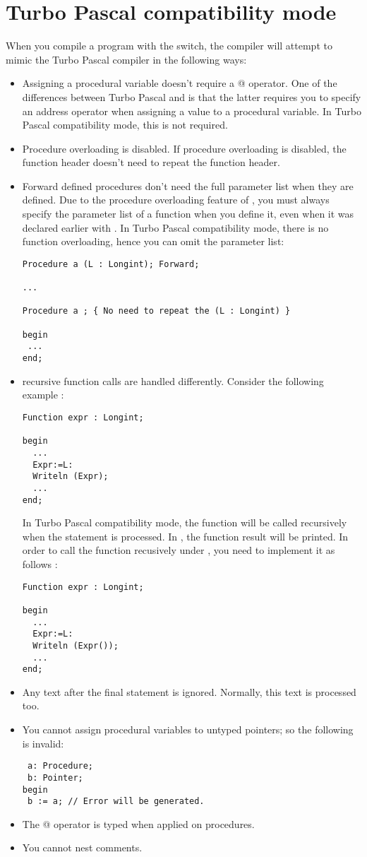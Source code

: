 \documentclass{report}
\begin{document}
\section{Turbo Pascal compatibility mode}
When you compile a program with the  switch, the compiler will
attempt to mimic the Turbo Pascal compiler in the following ways:
\begin{itemize}
\item Assigning a procedural variable doesn't require a @ operator. One of
the differences between Turbo Pascal and \fpc is that the latter requires
you to specify an address operator when assigning a value to a procedural
variable. In Turbo Pascal compatibility mode, this is not required.
\item Procedure overloading is disabled. If procedure overloading is
disabled, the function header doesn't need to repeat the function header.

\item Forward defined procedures don't need the full parameter list when
they are defined. Due to the procedure overloading feature of \fpc, you must
always specify the parameter list of a function when you define it, even
when it was declared earlier with . In Turbo Pascal
compatibility mode, there is no function overloading, hence you can omit the
parameter list:
\begin{verbatim}
Procedure a (L : Longint); Forward;

...

Procedure a ; { No need to repeat the (L : Longint) }

begin
 ...
end;

\end{verbatim}
\item recursive function calls are handled differently. Consider the
following example :
\begin{verbatim}
Function expr : Longint;

begin
  ...
  Expr:=L:
  Writeln (Expr);
  ...
end;
\end{verbatim}
In Turbo Pascal compatibility mode, the function will be called recursively
when the  statement is processed. In \fpc, the function result
will be printed. In order to call the function recusively under \fpc, you
need to implement it as follows :
\begin{verbatim}
Function expr : Longint;

begin
  ...
  Expr:=L:
  Writeln (Expr());
  ...
end;
\end{verbatim}
\item Any text after the final  statement is ignored. Normally,
this text is processed too.
\item You cannot assign procedural variables to untyped pointers; so the
following is invalid:
\begin{verbatim}
 a: Procedure;
 b: Pointer;
begin
 b := a; // Error will be generated.
\end{verbatim}
\item The @ operator is typed when applied on procedures.
\item You cannot nest comments.
\end{itemize}
\end{document}
